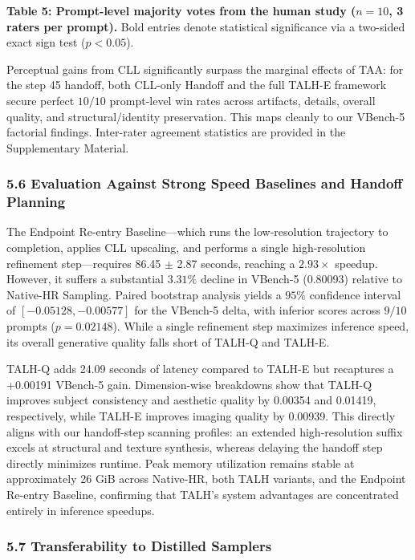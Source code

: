 \textbf{Table 5: Prompt-level majority votes from the human study (\(n=10\), 3 raters per prompt).} Bold entries denote statistical significance via a two-sided exact sign test (\(p < 0.05\)).

Perceptual gains from CLL significantly surpass the marginal effects of TAA: for the step 45 handoff, both CLL-only Handoff and the full TALH-E framework secure perfect \(10/10\) prompt-level win rates across artifacts, details, overall quality, and structural/identity preservation. This maps cleanly to our VBench-5 factorial findings. Inter-rater agreement statistics are provided in the Supplementary Material.

\hypertarget{evaluation-against-strong-speed-baselines-and-handoff-planning}{%
\subsubsection{5.6 Evaluation Against Strong Speed Baselines and Handoff Planning}\label{evaluation-against-strong-speed-baselines-and-handoff-planning}}

The Endpoint Re-entry Baseline---which runs the low-resolution trajectory to completion, applies CLL upscaling, and performs a single high-resolution refinement step---requires 86.45 \(\pm\) 2.87 seconds, reaching a \(2.93\times\) speedup. However, it suffers a substantial \(3.31\%\) decline in VBench-5 (0.80093) relative to Native-HR Sampling. Paired bootstrap analysis yields a \(95\%\) confidence interval of \([-0.05128, -0.00577]\) for the VBench-5 delta, with inferior scores across \(9/10\) prompts (\(p=0.02148\)). While a single refinement step maximizes inference speed, its overall generative quality falls short of TALH-Q and TALH-E.

TALH-Q adds 24.09 seconds of latency compared to TALH-E but recaptures a +0.00191 VBench-5 gain. Dimension-wise breakdowns show that TALH-Q improves subject consistency and aesthetic quality by 0.00354 and 0.01419, respectively, while TALH-E improves imaging quality by 0.00939. This directly aligns with our handoff-step scanning profiles: an extended high-resolution suffix excels at structural and texture synthesis, whereas delaying the handoff step directly minimizes runtime. Peak memory utilization remains stable at approximately 26 GiB across Native-HR, both TALH variants, and the Endpoint Re-entry Baseline, confirming that TALH's system advantages are concentrated entirely in inference speedups.

\hypertarget{transferability-to-distilled-samplers}{%
\subsubsection{5.7 Transferability to Distilled Samplers}\label{transferability-to-distilled-samplers}}

